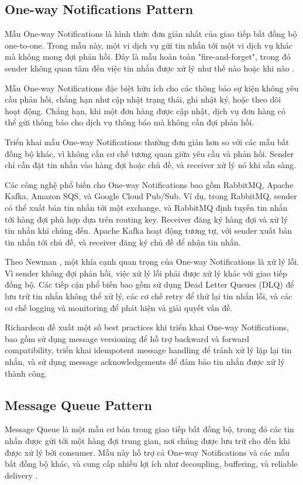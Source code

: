 \subsection{One-way Notifications Pattern}
Mẫu One-way Notifications là hình thức đơn giản nhất của giao tiếp bất đồng bộ one-to-one. Trong mẫu này, một vi dịch vụ gửi tin nhắn tới một vi dịch vụ khác mà không mong đợi phản hồi. Đây là mẫu hoàn toàn "fire-and-forget", trong đó sender không quan tâm đến việc tin nhắn được xử lý như thế nào hoặc khi nào \cite{hohpe2004}.

Mẫu One-way Notifications đặc biệt hữu ích cho các thông báo sự kiện không yêu cầu phản hồi, chẳng hạn như cập nhật trạng thái, ghi nhật ký, hoặc theo dõi hoạt động. Chẳng hạn, khi một đơn hàng được cập nhật, dịch vụ đơn hàng có thể gửi thông báo cho dịch vụ thông báo mà không cần đợi phản hồi.

Triển khai mẫu One-way Notifications thường đơn giản hơn so với các mẫu bất đồng bộ khác, vì không cần cơ chế tương quan giữa yêu cầu và phản hồi. Sender chỉ cần đặt tin nhắn vào hàng đợi hoặc chủ đề, và receiver xử lý nó khi sẵn sàng.

Các công nghệ phổ biến cho One-way Notifications bao gồm RabbitMQ, Apache Kafka, Amazon SQS, và Google Cloud Pub/Sub. Ví dụ, trong RabbitMQ, sender có thể xuất bản tin nhắn tới một exchange, và RabbitMQ định tuyến tin nhắn tới hàng đợi phù hợp dựa trên routing key. Receiver đăng ký hàng đợi và xử lý tin nhắn khi chúng đến. Apache Kafka hoạt động tương tự, với sender xuất bản tin nhắn tới chủ đề, và receiver đăng ký chủ đề để nhận tin nhắn.

Theo Newman \cite{newman2015}, một khía cạnh quan trọng của One-way Notifications là xử lý lỗi. Vì sender không đợi phản hồi, việc xử lý lỗi phải được xử lý khác với giao tiếp đồng bộ. Các tiếp cận phổ biến bao gồm sử dụng Dead Letter Queues (DLQ) để lưu trữ tin nhắn không thể xử lý, các cơ chế retry để thử lại tin nhắn lỗi, và các cơ chế logging và monitoring để phát hiện và giải quyết vấn đề.

Richardson \cite{richardson2019} đề xuất một số best practices khi triển khai One-way Notifications, bao gồm sử dụng message versioning để hỗ trợ backward và forward compatibility, triển khai idempotent message handling để tránh xử lý lặp lại tin nhắn, và sử dụng message acknowledgements để đảm bảo tin nhắn được xử lý thành công.

\subsection{Message Queue Pattern}
Message Queue là một mẫu cơ bản trong giao tiếp bất đồng bộ, trong đó các tin nhắn được gửi tới một hàng đợi trung gian, nơi chúng được lưu trữ cho đến khi được xử lý bởi consumer. Mẫu này hỗ trợ cả One-way Notifications và các mẫu bất đồng bộ khác, và cung cấp nhiều lợi ích như decoupling, buffering, và reliable delivery \cite{hohpe2004}.

